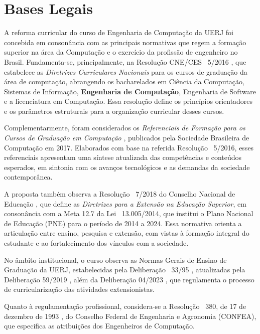 \chapter{Bases Legais}
\thispagestyle{plain}

A reforma curricular do curso de Engenharia de Computação da UERJ foi concebida em consonância com as principais normativas que regem a formação superior na área da Computação e o exercício da profissão de engenheiro no Brasil. Fundamenta-se, principalmente, na Resolução CNE/CES ~5/2016 \cite{cne2016}, que estabelece as \textit{Diretrizes Curriculares Nacionais} para os cursos de graduação da área de computação, abrangendo os bacharelados em Ciência da Computação, Sistemas de Informação, \textbf{Engenharia de Computação}, Engenharia de Software e a licenciatura em Computação. Essa resolução define os princípios orientadores e os parâmetros estruturais para a organização curricular desses cursos.

Complementarmente, foram considerados os \textit{Referenciais de Formação para os Cursos de Graduação em Computação} \cite{sbc2017}, publicados pela Sociedade Brasileira de Computação em 2017. Elaborados com base na referida Resolução ~5/2016, esses referenciais apresentam uma síntese atualizada das competências e conteúdos esperados, em sintonia com os avanços tecnológicos e as demandas da sociedade contemporânea.

A proposta também observa a Resolução ~7/2018 do Conselho Nacional de Educação \cite{cne2018}, que define as \textit{Diretrizes para a Extensão na Educação Superior}, em consonância com a Meta 12.7 da Lei ~13.005/2014, que institui o Plano Nacional de Educação (PNE) para o período de 2014 a 2024. Essa normativa orienta a articulação entre ensino, pesquisa e extensão, com vistas à formação integral do estudante e ao fortalecimento dos vínculos com a sociedade.

No âmbito institucional, o curso observa as Normas Gerais de Ensino de Graduação da UERJ, estabelecidas pela Deliberação ~33/95 \cite{uerj1995}, atualizadas pela Deliberação  59/2019 \cite{uerj2019}, além da Deliberação  04/2023 \cite{uerj2023}, que regulamenta o processo de curricularização das atividades extensionistas.

Quanto à regulamentação profissional, considera-se a Resolução ~380, de 17 de dezembro de 1993 \cite{confea1993}, do Conselho Federal de Engenharia e Agronomia (CONFEA), que especifica as atribuições dos Engenheiros de Computação.

